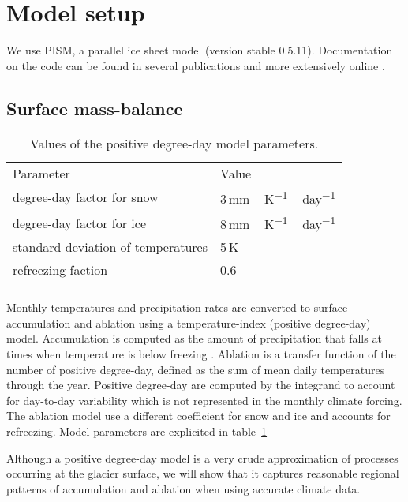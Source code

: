 
\section{Model setup}
\label{sec:setup}

We use PISM, a parallel ice sheet model (version stable 0.5.11). Documentation on the code can be found in several publications \citep[e.g.,][]{bueler-brown-2009,winkelmann-etal-2011,aschwanden-etal-2012} and more extensively online \citep[{\url{http://www.pism-docs.org}},][]{web:pism}.

\subsection{Surface mass-balance}

\begin{table}[t]
	\caption{Values of the positive degree-day model parameters.}
	\label{tab:pdd}
	\vskip4mm
	\centering
	\begin{tabular}{ll}
		\tophline
		Parameter& Value\\
		\middlehline
		degree-day factor for snow & 3\,\unit{mm\,K^{-1}\,day^{-1}}\\
		degree-day factor for ice & 8\,\unit{mm\,K^{-1}\,day^{-1}}\\
		standard deviation of temperatures & 5\,K\\
		refreezing faction & 0.6 \\
		\bottomhline
	\end{tabular}
\end{table}

Monthly temperatures and precipitation rates are converted to surface accumulation and ablation using a temperature-index (positive degree-day) model\needref. Accumulation is computed as the amount of precipitation that falls at times when temperature is below freezing . Ablation is a transfer function of the number of positive degree-day, defined as the sum of mean daily temperatures through the year. Positive degree-day are computed by the \citet{calov-greve-2011} integrand to account for day-to-day variability which is not represented in the monthly climate forcing. The ablation model use a different coefficient for snow and ice and accounts for refreezing. Model parameters are explicited in table~\ref{tab:pdd}

Although a positive degree-day model is a very crude approximation of processes occurring at the glacier surface, we will show that it captures reasonable regional patterns of accumulation and ablation when using accurate climate data.

